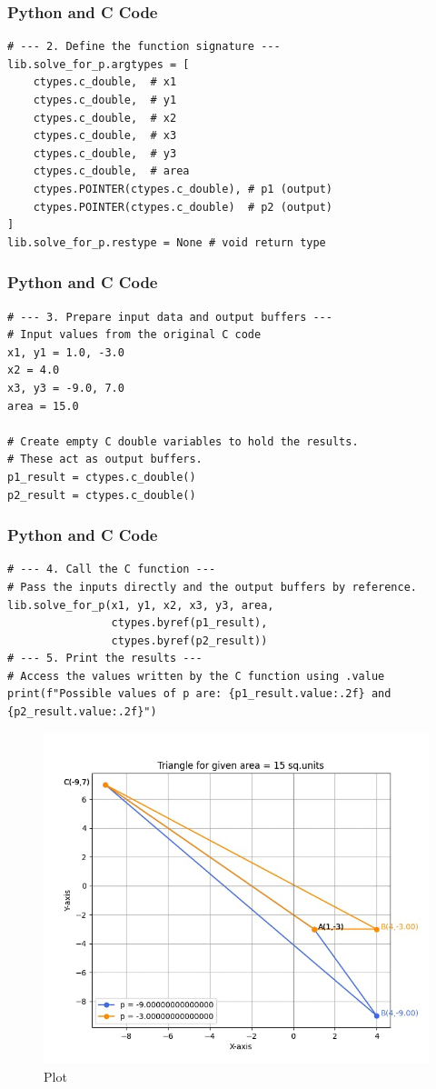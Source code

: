 \documentclass{beamer}
\begin{document}
\begin{frame}[fragile]
\frametitle{Python and C Code}

\begin{lstlisting}
# --- 2. Define the function signature ---
lib.solve_for_p.argtypes = [
    ctypes.c_double,  # x1
    ctypes.c_double,  # y1
    ctypes.c_double,  # x2
    ctypes.c_double,  # x3
    ctypes.c_double,  # y3
    ctypes.c_double,  # area
    ctypes.POINTER(ctypes.c_double), # p1 (output)
    ctypes.POINTER(ctypes.c_double)  # p2 (output)
]
lib.solve_for_p.restype = None # void return type
\end{lstlisting}
\end{frame}

\begin{frame}[fragile]
\frametitle{Python and C Code}

\begin{lstlisting}
# --- 3. Prepare input data and output buffers ---
# Input values from the original C code
x1, y1 = 1.0, -3.0
x2 = 4.0
x3, y3 = -9.0, 7.0
area = 15.0

# Create empty C double variables to hold the results.
# These act as output buffers.
p1_result = ctypes.c_double()
p2_result = ctypes.c_double()
\end{lstlisting}
\end{frame}

\begin{frame}[fragile]
\frametitle{Python and C Code}

\begin{lstlisting}
# --- 4. Call the C function ---
# Pass the inputs directly and the output buffers by reference.
lib.solve_for_p(x1, y1, x2, x3, y3, area, 
                ctypes.byref(p1_result), 
                ctypes.byref(p2_result))
# --- 5. Print the results ---
# Access the values written by the C function using .value
print(f"Possible values of p are: {p1_result.value:.2f} and {p2_result.value:.2f}")
\end{lstlisting}

\end{frame}

 


\begin{figure}
    \centering
    \includegraphics[width=0.75\columnwidth]{graph-1.png}
    \caption{Plot}
    \label{fig:placeholder}
\end{figure}
\end{document}
